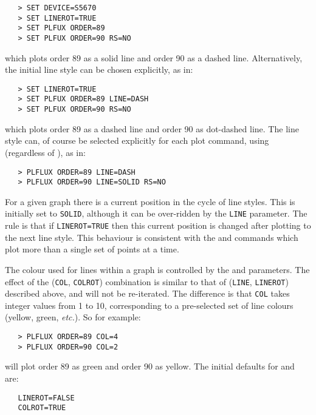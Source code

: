 \begin{verbatim}
   > SET DEVICE=S5670
   > SET LINEROT=TRUE
   > SET PLFUX ORDER=89
   > SET PLFUX ORDER=90 RS=NO
\end{verbatim}

which plots order 89 as a solid line and order 90 as a dashed line.
Alternatively, the initial line style can be chosen explicitly, as in:

\begin{verbatim}
   > SET LINEROT=TRUE
   > SET PLFUX ORDER=89 LINE=DASH
   > SET PLFUX ORDER=90 RS=NO
\end{verbatim}

which plots order 89 as a dashed line and order 90 as dot-dashed line.
The line style can, of course be selected explicitly for each plot command,
using 
 (regardless of ), as in:

\begin{verbatim}
   > PLFLUX ORDER=89 LINE=DASH
   > PLFLUX ORDER=90 LINE=SOLID RS=NO
\end{verbatim}

For a given graph there is a current position in the cycle of line
styles.  This is initially set to \verb+SOLID+, although it can be
over-ridden by the \verb+LINE+ parameter.  The rule is that if
\verb+LINEROT=TRUE+ then this current position is changed after plotting to the
next line style.  This behaviour is consistent with the
 and 
commands which plot more than a single set of points at a time.

The colour used for lines within a graph is controlled by the
 and 
 parameters.  The effect of the (\verb+COL+, \verb+COLROT+)
combination is similar to that of (\verb+LINE+, \verb+LINEROT+) described
above, and will not be re-iterated.  The difference is that \verb+COL+ takes
integer values from 1 to  10,  corresponding to a pre-selected set of line
colours (yellow, green, {\it etc.})\@.  So for example:

\begin{verbatim}
   > PLFLUX ORDER=89 COL=4
   > PLFLUX ORDER=90 COL=2
\end{verbatim}

will plot order 89 as green and order 90 as yellow.  The initial
defaults for  and
 are:

\begin{verbatim}
   LINEROT=FALSE
   COLROT=TRUE
\end{verbatim}

